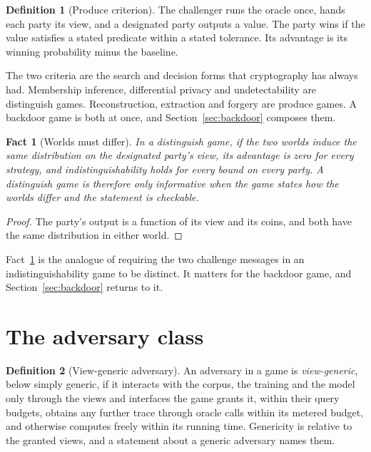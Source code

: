 \documentclass[11pt]{article}
\theoremstyle{definition}
\newtheorem{definition}{Definition}
\theoremstyle{plain}
\newtheorem{fact}{Fact}
\theoremstyle{remark}
\begin{document}
\begin{definition}[Produce criterion]
\label{def:prod}
The challenger runs the oracle once, hands each party its view, and a designated
party outputs a value. The party wins if the value satisfies a stated predicate
within a stated tolerance. Its advantage is its winning probability minus the
baseline.
\end{definition}

The two criteria are the search and decision forms that cryptography has always
had. Membership inference, differential privacy and undetectability are
distinguish games. Reconstruction, extraction and forgery are produce games. A
backdoor game is both at once, and Section~\ref{sec:backdoor} composes them.

\begin{fact}[Worlds must differ]
\label{fact:differ}
In a distinguish game, if the two worlds induce the same distribution on the
designated party's view, its advantage is zero for every strategy, and
indistinguishability holds for every bound on every party. A distinguish game is
therefore only informative when the game states how the worlds differ and the
statement is checkable.
\end{fact}

\begin{proof}
The party's output is a function of its view and its coins, and both have the same
distribution in either world.
\end{proof}

Fact~\ref{fact:differ} is the analogue of requiring the two challenge messages in
an indistinguishability game to be distinct. It matters for the backdoor game, and
Section~\ref{sec:backdoor} returns to it.

\section{The adversary class}
\label{sec:class}

\begin{definition}[View-generic adversary]
\label{def:generic}
An adversary in a game is \emph{view-generic}, below simply generic, if it
interacts with the corpus, the training and the model only through the views and
interfaces the game grants it, within their query budgets, obtains any further
trace through oracle calls within its metered budget, and otherwise computes
freely within its running time. Genericity is relative to the granted views, and
a statement about a generic adversary names them.
\end{definition}
\end{document}
